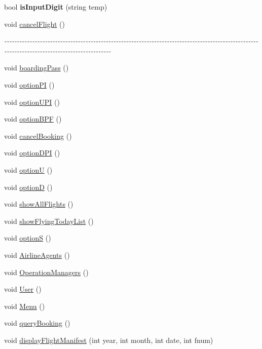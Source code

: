 \begin{DoxyCompactItemize}
\item 
\hypertarget{classgui_a57cb6f9802b7fa6a73fb43e71c4e84af}{
bool {\bfseries isInputDigit} (string temp)}
\label{classgui_a57cb6f9802b7fa6a73fb43e71c4e84af}

\item 
void \hyperlink{classgui_a819f4cfa292f74772159c562a56cd298}{cancelFlight} ()
\begin{DoxyCompactList}\small\item\em -\/-\/-\/-\/-\/-\/-\/-\/-\/-\/-\/-\/-\/-\/-\/-\/-\/-\/-\/-\/-\/-\/-\/-\/-\/-\/-\/-\/-\/-\/-\/-\/-\/-\/-\/-\/-\/-\/-\/-\/-\/-\/-\/-\/-\/-\/-\/-\/-\/-\/-\/-\/-\/-\/-\/-\/-\/-\/-\/-\/-\/-\/-\/-\/-\/-\/-\/-\/-\/-\/-\/-\/-\/-\/-\/-\/-\/-\/-\/-\/-\/-\/-\/-\/-\/-\/-\/-\/-\/-\/-\/-\/-\/-\/-\/-\/-\/-\/-\/-\/-\/-\/-\/-\/-\/-\/-\/-\/-\/-\/-\/-\/-\/-\/-\/-\/-\/-\/-\/-\/-\/-\/-\/-\/-\/-\/-\/-\/-\/-\/-\/-\/-\/-\/-\/-\/-\/-\/-\/-\/-\/-\/ \item\end{DoxyCompactList}\item 
void \hyperlink{classgui_abe0e499ac3e81760d8a1e4d1fdbc3510}{boardingPass} ()
\item 
void \hyperlink{classgui_a1da09a34a60debec7214d3f2d9691c73}{optionPI} ()
\item 
void \hyperlink{classgui_ad5b000e91b8802954731689d9d9a4bd7}{optionUPI} ()
\item 
void \hyperlink{classgui_ac0563c10c6b42a47238cc7cc8445a989}{optionBPF} ()
\item 
void \hyperlink{classgui_ad8b14592f8959e7b1ff829722c182834}{cancelBooking} ()
\item 
void \hyperlink{classgui_ad59aed173b2688436ed753da2d0e903f}{optionDPI} ()
\item 
void \hyperlink{classgui_ad6587b34a7c6f8c087af1665f5dd7b71}{optionU} ()
\item 
void \hyperlink{classgui_a0534e0904bd2e2e3694e3da5396d1339}{optionD} ()
\item 
void \hyperlink{classgui_a5c6627bafacf8ced6dde1abc32e8dea8}{showAllFlights} ()
\item 
void \hyperlink{classgui_ad42a2964e4ab71b2f1df11bf0f193d4d}{showFlyingTodayList} ()
\item 
void \hyperlink{classgui_afa7a5fc9b6f835a69a0c8433711fad57}{optionS} ()
\item 
void \hyperlink{classgui_ae39757d1c6bdbfa938dbe3226a36febb}{AirlineAgents} ()
\item 
void \hyperlink{classgui_afe37700bacd80503661c4f45b55019bd}{OperationManagers} ()
\item 
void \hyperlink{classgui_a3c2584790da727b2c2fabc178c449ea3}{User} ()
\item 
void \hyperlink{classgui_a57cd3dc1eca1d8cb7aabb9fa75d79702}{Menu} ()
\item 
void \hyperlink{classgui_afa3406b6b5747f7cabcc468721db8c9e}{queryBooking} ()
\item 
void \hyperlink{classgui_a4f081caa9fddc8d4353c7be8ab753a24}{displayFlightManifest} (int year, int month, int date, int fnum)
\end{DoxyCompactItemize}


